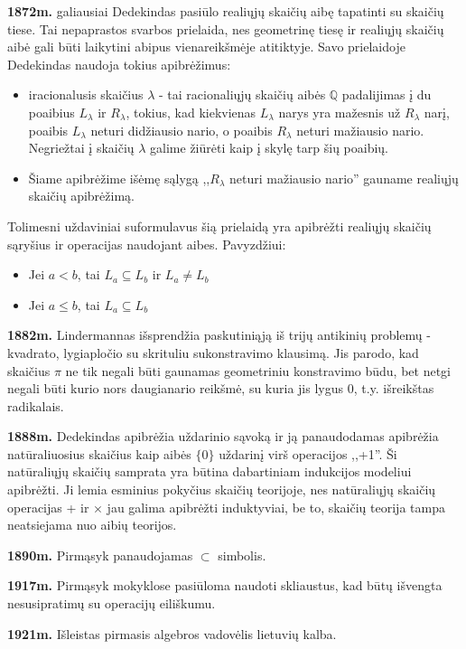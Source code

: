 \documentclass{article}
\begin{document}
\textbf{1872m.} galiausiai Dedekindas pasiūlo realiųjų skaičių aibę tapatinti su skaičių tiese. Tai nepaprastos svarbos prielaida, nes geometrinę tiesę ir realiųjų skaičių aibė gali būti laikytini abipus vienareikšmėje atitiktyje. Savo prielaidoje Dedekindas naudoja tokius apibrėžimus: 
\begin{itemize}
\item iracionalusis skaičius $\lambda$ - tai racionaliųjų skaičių aibės $\mathbb{Q}$ padalijimas į du poaibius $L_\lambda$ ir $R_\lambda$, tokius, kad kiekvienas $L_\lambda$ narys yra mažesnis už $R_\lambda$ narį, poaibis $L_\lambda$ neturi didžiausio nario, o poaibis $R_\lambda$ neturi mažiausio nario. Negriežtai į skaičių $\lambda$ galime žiūrėti kaip į skylę tarp šių poaibių. 
\item Šiame apibrėžime išėmę sąlygą ,,$R_\lambda$ neturi mažiausio nario'' gauname realiųjų skaičių apibrėžimą.
\end{itemize}
Tolimesni uždaviniai suformulavus šią prielaidą yra apibrėžti realiųjų skaičių sąryšius ir operacijas naudojant aibes. Pavyzdžiui:
\begin{itemize}
\item Jei $a < b$, tai $L_a\subseteq L_b$ ir $L_a\neq L_b$
\item Jei $a\le b$, tai $L_a\subseteq L_b$
\end{itemize}

\textbf{1882m.} Lindermannas išsprendžia paskutiniąją iš trijų antikinių problemų - kvadrato, lygiapločio su skrituliu sukonstravimo klausimą. Jis parodo, kad skaičius $\pi$ ne tik negali būti gaunamas geometriniu konstravimo būdu, bet netgi negali būti kurio nors daugianario reikšmė, su kuria jis lygus 0, t.y. išreikštas radikalais.

\textbf{1888m.} Dedekindas apibrėžia uždarinio sąvoką ir ją panaudodamas apibrėžia natūraliuosius skaičius kaip aibės $\{0\}$ uždarinį virš operacijos ,,+1''. Ši natūraliųjų skaičių samprata yra būtina dabartiniam indukcijos modeliui apibrėžti. Ji lemia esminius pokyčius skaičių teorijoje, nes natūraliųjų skaičių operacijas + ir $\times$ jau galima apibrėžti induktyviai, be to, skaičių teorija tampa neatsiejama nuo aibių teorijos. 

\textbf{1890m.} Pirmąsyk panaudojamas $\subset$ simbolis.

\textbf{1917m.} Pirmąsyk mokyklose pasiūloma naudoti skliaustus, kad būtų išvengta nesusipratimų su operacijų eiliškumu.

\textbf{1921m.} Išleistas pirmasis algebros vadovėlis lietuvių kalba.
\end{document}
